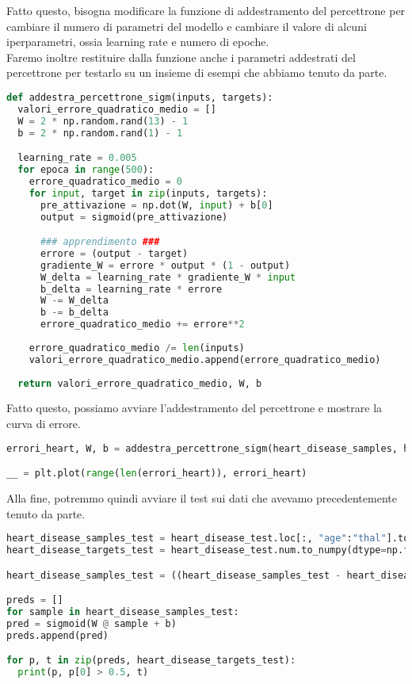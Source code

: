 Fatto questo, bisogna modificare la funzione di addestramento del percettrone per cambiare il numero di parametri del modello e cambiare il valore di alcuni iperparametri, ossia learning rate e numero di epoche.\\
Faremo inoltre restituire dalla funzione anche i parametri addestrati del percettrone per testarlo su un insieme di esempi che abbiamo tenuto da parte.

\begin{lstlisting}[language=Python, caption=Funzione di Addestramento]
def addestra_percettrone_sigm(inputs, targets):
  valori_errore_quadratico_medio = [] 
  W = 2 * np.random.rand(13) - 1
  b = 2 * np.random.rand(1) - 1

  learning_rate = 0.005
  for epoca in range(500):
    errore_quadratico_medio = 0
    for input, target in zip(inputs, targets): 
      pre_attivazione = np.dot(W, input) + b[0]
      output = sigmoid(pre_attivazione) 

      ### apprendimento ###
      errore = (output - target)
      gradiente_W = errore * output * (1 - output)
      W_delta = learning_rate * gradiente_W * input
      b_delta = learning_rate * errore
      W -= W_delta
      b -= b_delta
      errore_quadratico_medio += errore**2
      
    errore_quadratico_medio /= len(inputs)
    valori_errore_quadratico_medio.append(errore_quadratico_medio)
  
  return valori_errore_quadratico_medio, W, b   
\end{lstlisting}

Fatto questo, possiamo avviare l'addestramento del percettrone e mostrare la curva di errore.

\begin{lstlisting}[language=Python, caption=Addestramento del Percettrone]
errori_heart, W, b = addestra_percettrone_sigm(heart_disease_samples, heart_disease_targets)

__ = plt.plot(range(len(errori_heart)), errori_heart)
\end{lstlisting}

Alla fine, potremmo quindi avviare il test sui dati che avevamo precedentemente tenuto da parte.

\begin{lstlisting}[language=Python, caption=Labelling dei Dati e Predizione]
heart_disease_samples_test = heart_disease_test.loc[:, "age":"thal"].to_numpy()
heart_disease_targets_test = heart_disease_test.num.to_numpy(dtype=np.float64)

heart_disease_samples_test = ((heart_disease_samples_test - heart_disease_samples_test.mean(axis=0)) / heart_disease_samples_test.std(axis=0))

preds = []
for sample in heart_disease_samples_test:
pred = sigmoid(W @ sample + b)
preds.append(pred)

for p, t in zip(preds, heart_disease_targets_test):
  print(p, p[0] > 0.5, t)
\end{lstlisting}

